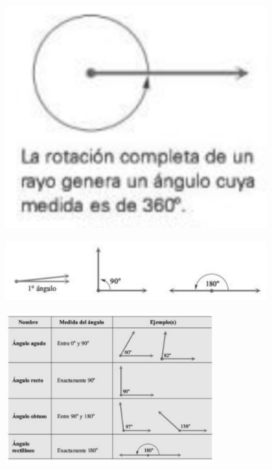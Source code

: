 {}
	\begin{figure}
		\centering
		\includegraphics[width=10cm,keepaspectratio=true]{./trig/trig_101-4.png}
		\label{fig:101-4}
	\end{figure}
	

{}
	\begin{figure}
		\centering
		\includegraphics[width=10cm,keepaspectratio=true]{./trig/trig_101-5.png}
		\label{fig:101-5}
	\end{figure}
	

{}
	\begin{figure}
		\centering
		\includegraphics[width=8cm,keepaspectratio=true]{./trig/trig_101-tab1.png}
		\label{fig:101-tab1}
	\end{figure}
	

